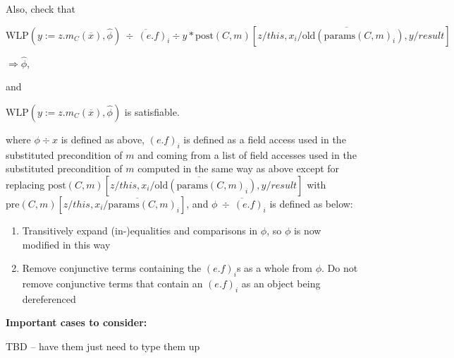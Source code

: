 \documentclass {article}
\newcommand{\fphi}{\widehat{\phi}}
\newcommand{\imp}{\Rightarrow}
\newcommand{\presub}{\text{pre}(C,m)\left[z/this, \overline{x_i/\text{params}(C,m)_i}\right]}
\newcommand{\postsub}{\text{post}(C,m)\left[z/this, \overline{x_i/\text{old}(\text{params}(C,m)_i)},y/result\right]}
\newcommand{\wlp}[2]{\text{WLP}(#1,#2)}
\begin{document}
Also, check that 

$\wlp{y := z.m_C(\overline{x})}{\fphi} \overline{\ \div \ (e.f)_i} \div y \ast \postsub$

\hspace{1cm} $\imp \fphi$,

and


$\wlp{y := z.m_C(\overline{x})}{\fphi}$ is satisfiable. 


where $\phi \div x$ is defined as above, $(e.f)_i$ is defined as a field access used in the substituted precondition of $m$ and coming from a list of field accesses used in the substituted precondition of $m$ computed in the same way as above except for replacing $\postsub$ with $\presub$, and $\phi \overline{\ \div \ (e.f)_i}$ is defined as below:

\begin{enumerate}
\item Transitively expand (in-)equalities and comparisons in $\phi$, so $\phi$ is now modified in this way
\item Remove conjunctive terms containing the $(e.f)_i$s as a whole from $\phi$. Do not remove conjunctive terms that contain an $(e.f)_i$ as an object being dereferenced
\end{enumerate}


\textbf{Important cases to consider:}

TBD -- have them just need to type them up
%
\end{document}
